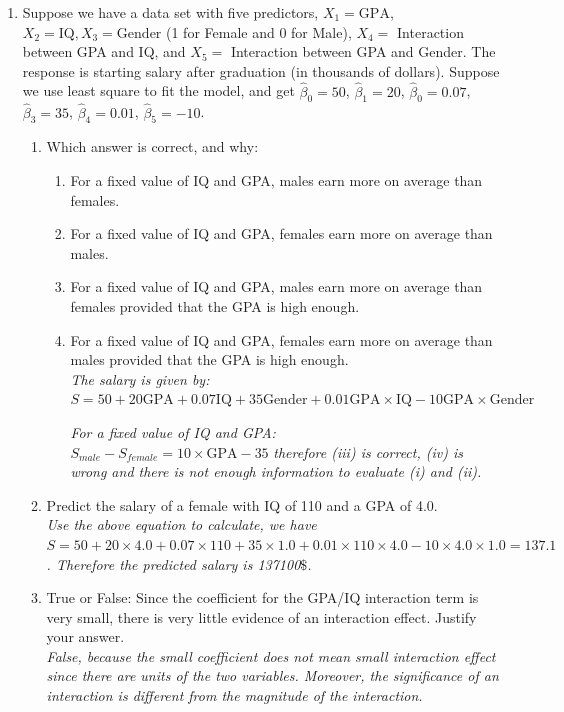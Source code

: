 \documentclass[12pt]{article}
\begin{document}
\begin{enumerate}
    \item Suppose we have a data set with five predictors, $X_1 = \text{GPA}$, $X_2 = \text{IQ}, X_3 =\text{Gender}$ (1 for Female and 0 for Male), $X_4 =$ Interaction between GPA and IQ, and $X_5=$ Interaction between GPA and Gender. The response is starting salary after graduation (in thousands of dollars). Suppose we use least square to fit the model, and get $\hat{\beta}_0=50$, $\hat{\beta}_1=20$, $\hat{\beta}_0=0.07$, $\hat{\beta}_3=35$, $\hat{\beta}_4=0.01$, $\hat{\beta}_5=-10$.

\begin{enumerate}[label=(\alph*)]
    \item Which answer is correct, and why:
    
    \begin{enumerate}[label=(\roman*)]
        \item For a fixed value of IQ and GPA, males earn more on average than females.
        \item For a fixed value of IQ and GPA, females earn more on average than males.
        \item For a fixed value of IQ and GPA, males earn more on average than females provided that the GPA is high enough.
        \item For a fixed value of IQ and GPA, females earn more on average than males provided that the GPA is high enough.
        \\ \textit{The salary is given by:}
        \\$S = 50 + 20\text{GPA}+0.07\text{IQ}+35\text{Gender} + 0.01\text{GPA}\times\text{IQ} - 10\text{GPA}\times\text{Gender}$
        
        \textit{For a fixed value of IQ and GPA: }
        \\$S_{male} - S_{female} = 10\times\text{GPA}-35$ \textit{therefore (iii) is correct, (iv) is wrong and there is not enough information to evaluate (i) and (ii).}
    \end{enumerate}
    
    \item Predict the salary of a female with IQ of 110 and a GPA of 4.0.
    \\\textit{Use the above equation to calculate, we have $S = 50 + 20\times4.0 + 0.07\times110 + 35\times1.0 + 0.01\times110\times4.0-10\times4.0\times1.0 = 137.1$. Therefore the predicted salary is 137100$\$$.}
    \item True or False: Since the coefficient for the GPA/IQ interaction term is very small, there is very little evidence of an interaction effect. Justify your answer.
    \\ \textit{False, because the small coefficient does not mean small interaction effect since there are units of the two variables. Moreover, the significance of an interaction is different from the magnitude of the interaction.}
\end{enumerate}


\end{enumerate}
\end{document}
